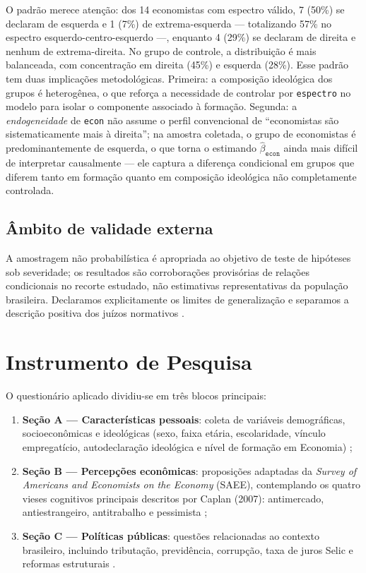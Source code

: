 

O padrão merece atenção: dos 14 economistas com espectro válido, 7 (50\%) se declaram de esquerda e 1 (7\%) de extrema-esquerda — totalizando 57\% no espectro esquerdo-centro-esquerdo —, enquanto 4 (29\%) se declaram de direita e nenhum de extrema-direita. No grupo de controle, a distribuição é mais balanceada, com concentração em direita (45\%) e esquerda (28\%). Esse padrão tem duas implicações metodológicas. Primeira: a composição ideológica dos grupos é heterogênea, o que reforça a necessidade de controlar por \texttt{espectro} no modelo para isolar o componente associado à formação. Segunda: a \textit{endogeneidade} de \texttt{econ} não assume o perfil convencional de ``economistas são sistematicamente mais à direita''; na amostra coletada, o grupo de economistas é predominantemente de esquerda, o que torna o estimando $\hat{\beta}_{\texttt{econ}}$ ainda mais difícil de interpretar causalmente — ele captura a diferença condicional em grupos que diferem tanto em formação quanto em composição ideológica não completamente controlada.

\subsection{Âmbito de validade externa}

A amostragem não probabilística é apropriada ao objetivo de teste de hipóteses sob severidade; os resultados são corroborações provisórias de relações condicionais no recorte estudado, não estimativas representativas da população brasileira. Declaramos explicitamente os limites de generalização e separamos a descrição positiva dos juízos normativos \cite{hausman2008}.

\section{Instrumento de Pesquisa}

O questionário aplicado dividiu-se em três blocos principais:
\begin{enumerate}[label=\alph*)]
    \item \textbf{Seção A — Características pessoais}: coleta de variáveis demográficas, socioeconômicas e ideológicas (sexo, faixa etária, escolaridade, vínculo empregatício, autodeclaração ideológica e nível de formação em Economia) \cite{downs1957economic,kahan2012polarization};
    \item \textbf{Seção B — Percepções econômicas}: proposições adaptadas da \textit{Survey of Americans and Economists on the Economy} (SAEE), contemplando os quatro vieses cognitivos principais descritos por Caplan (2007): antimercado, antiestrangeiro, antitrabalho e pessimista \cite{blendon1997,Systematically_Biased_Beliefs_about_Economics};
    \item \textbf{Seção C — Políticas públicas}: questões relacionadas ao contexto brasileiro, incluindo tributação, previdência, corrupção, taxa de juros Selic e reformas estruturais \cite{franco2017moeda,sowell2004applied,zaller1992nature}.
\end{enumerate}

